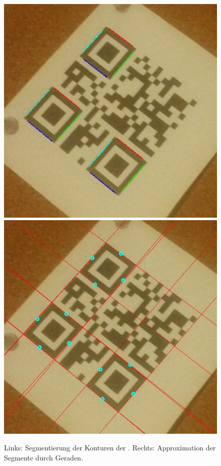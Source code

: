 \begin{figure}[h]
\center
\includegraphics[scale=0.25]{images/qrcode-adler-wand_4___SEGMENTS___.jpg}
\hspace{5px}
\includegraphics[scale=0.25]{images/qrcode-adler-wand_5___LINES___.jpg}
\caption{Links: Segmentierung der Konturen der \fps. Rechts: Approximation der Segmente durch Geraden.\label{fig:lines}}
\end{figure}

